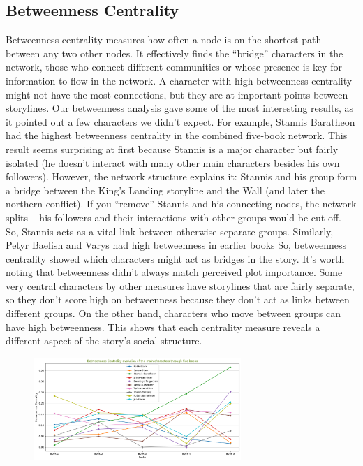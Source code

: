 \documentclass[12pt, a4paper]{article}
\begin{document}
\subsection*{Betweenness Centrality}
Betweenness centrality measures how often a node is on the 
shortest path between any two other nodes. It effectively 
finds the ``bridge'' characters in the network, those who 
connect different communities or whose presence is key for 
information to flow in the network. A character with high 
betweenness centrality might not have the most connections, 
but they are at important points between storylines. 
Our betweenness analysis gave some of the most interesting 
results, as it pointed out a few characters we didn't expect. 
For example, Stannis Baratheon had the highest betweenness 
centrality in the combined five-book network. This result 
seems surprising at first because Stannis is a major character but 
fairly isolated (he doesn't interact with many other main characters 
besides his own followers). However, the network structure explains 
it: Stannis and his group form a bridge between the King's Landing 
storyline and the Wall (and later the northern conflict). 
If you ``remove'' Stannis and his connecting nodes, 
the network splits – his followers 
and their interactions with other groups would be cut off. 
So, Stannis acts as a vital link between otherwise separate 
groups.
Similarly, Petyr Baelish and Varys had high 
betweenness in earlier books
So, betweenness centrality 
showed which characters might act as bridges in the story. It's 
worth noting that betweenness didn't always match perceived plot 
importance. Some very central characters by other measures 
 have storylines that are fairly separate, 
 so they don't score high on betweenness 
because they don't act as links between different groups. 
On the other hand, characters who move between groups 
can have high betweenness. This shows that each centrality 
measure reveals a different aspect of the story's social structure. 

\begin{figure}[htbp]
      \centering
      \includegraphics[width=0.7\textwidth]{betweenness-all.png}
      \label{fig:betweennessall}
\end{figure}
\FloatBarrier
\end{document}
